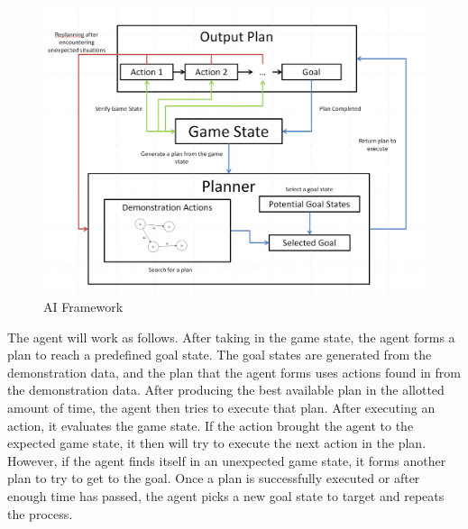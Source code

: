 \begin{figure}[h]
	\centering
	\includegraphics[width=\textwidth]{Figures/SearchFlowChart.png}
	\caption{AI Framework}
	\label{transitions}
\end{figure}

The agent will work as follows. After taking in the game state, the agent forms a plan to reach a predefined goal state. The goal states are generated from the demonstration data, and the plan that the agent forms uses actions found in from the demonstration data. After producing the best available plan in the allotted amount of time, the agent then tries to execute that plan. After executing an action, it evaluates the game state. If the action brought the agent to the expected game state, it then will try to execute the next action in the plan. However, if the agent finds itself in an unexpected game state, it forms another plan to try to get to the goal. Once a plan is successfully executed or after enough time has passed, the agent picks a new goal state to target and repeats the process.
